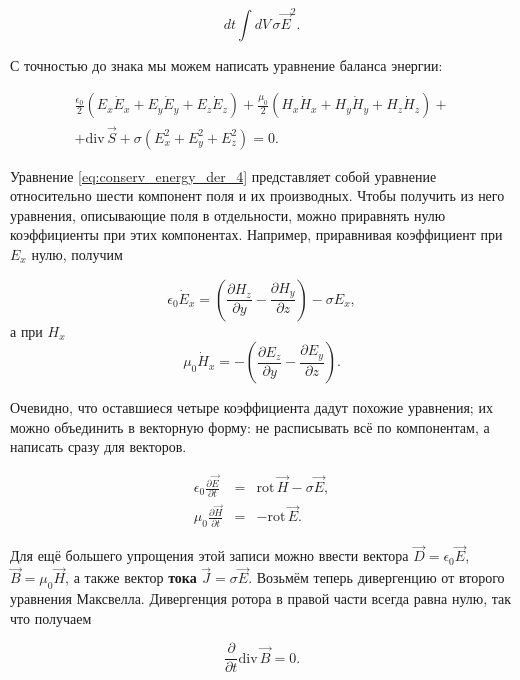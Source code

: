 \documentclass[12pt,a4paper]{article}
\numberwithin{equation}{section}
\numberwithin{equation}{section}
\newcommand{\nn}{\nonumber}
\newcommand{\pt}{\partial}
\newcommand{\rot}{\mathrm{rot}\,}
\renewcommand{\div}{\mathrm{div}\,}
\newcommand{\eps}{\epsilon}
\begin{document}
\begin{equation}
  \label{eq:conserv_energy_der_3}
  dt \int dV\, \sigma \vec{E}^2.
\end{equation}

С точностью до знака мы можем написать уравнение баланса энергии: 

\begin{eqnarray}
  \label{eq:conserv_energy_der_4}
\nn
  \frac{\eps_0}{2} \left(E_x \dot{E}_x + E_y \dot{E}_y +
    E_z \dot{E}_z \right) +   \frac{\mu_0}{2} \left(H_x \dot{H}_x + H_y \dot{H}_y +
    H_z \dot{H}_z \right) + \\
+ \div \vec{S} + \sigma \left(E_x^2 + E_y^2 +E_z^2 \right) =0.
\end{eqnarray}

Уравнение \eqref{eq:conserv_energy_der_4} представляет собой уравнение
относительно шести компонент поля и их производных. Чтобы получить из
него уравнения, описывающие поля в отдельности, можно приравнять нулю
коэффициенты при этих компонентах. Например, приравнивая коэффициент
при $E_x$ нулю, получим

\begin{equation}
  \label{eq:conserv_energy_der_5}
  \eps_0 \dot{E}_x = \left( \frac{\pt H_z}{\pt y} - \frac{\pt H_y}{\pt
      z}\right) - \sigma E_x,
\end{equation}
а при $H_x$ 
\begin{equation}
  \label{eq:conserv_energy_der_5}
  \mu_0 \dot{H}_x = -\left( \frac{\pt E_z}{\pt y} - \frac{\pt
      E_y}{\pt z}\right).
\end{equation}

Очевидно, что оставшиеся четыре коэффициента дадут похожие уравнения;
их можно объединить в векторную форму: не расписывать всё по
компонентам, а написать сразу для векторов.

\begin{eqnarray}
  \label{eq:maxwell_half}
\nn
  \eps_0 \frac{\pt \vec{E}}{\pt t} &=& \rot \vec{H} - \sigma
  \vec{E},\\
  \mu_0 \frac{\pt \vec{H}}{\pt t} &=& -\rot \vec{E}.
\end{eqnarray}

Для ещё большего упрощения этой записи можно ввести вектора $\vec{D} =
\eps_0 \vec{E}$, $\vec{B} = \mu_0 \vec{H}$, а также вектор
\textbf{тока} $\vec{J} = \sigma \vec{E}$. Возьмём теперь дивергенцию
от второго уравнения Максвелла. Дивергенция ротора в правой части
всегда равна нулю, так что получаем

\begin{equation}
  \label{eq:gauss_magnet}
  \frac{\pt}{\pt t} \div \vec{B} = 0.
\end{equation}
\end{document}
